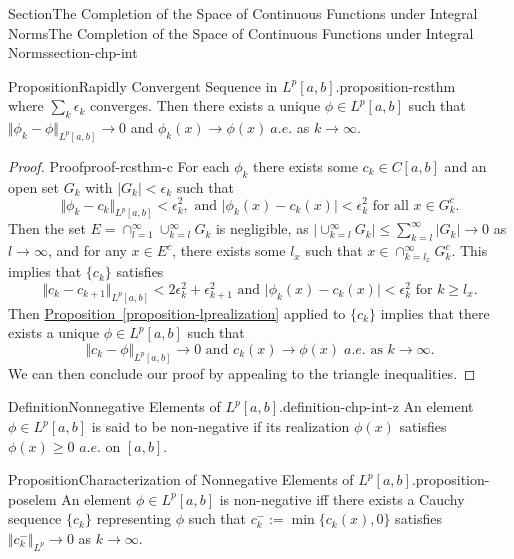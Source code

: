 \documentclass[oneside,10pt,]{article}
\newcommand{\xreffont}{\relax}
\numberwithin{equation}{section}
\begin{document}
\begin{sectionptx}{Section}{The Completion of the Space of Continuous Functions under Integral Norms}{}{The Completion of the Space of Continuous Functions under Integral Norms}{}{}{section-chp-int}
\begin{proposition}{Proposition}{Rapidly Convergent Sequence in \(L^{p}[a, b]\).}{}{proposition-rcsthm}
\begin{equation*}
\end{equation*}
where \(\sum_{k}  \epsilon_{k}\) converges. Then there exists a unique \(\phi \in L^{p}[a, b]\) such that \(\Vert \phi_{k} - \phi \Vert_{L^{p}[a, b]}\to 0\) and \(\phi_{k} (x) \to \phi (x)\)\(\ a.e.\) as \(k\to \infty\).\end{proposition}
\begin{proof}{Proof}{}{proof-rcsthm-c}
For each \(\phi_{k}\) there exists some \(c_{k} \in C[a,  b]\) and an open set  \(G_{k}\) with \(|G_{k}| < \epsilon_{k}\) such that%
\begin{equation*}
\Vert \phi_{k} - c_{k} \Vert_{L^{p}[a, b]} < \epsilon_{k}^{2}, \text{ and } 
\vert \phi_{k} (x) - c_{k}(x) \vert < \epsilon_{k}^{2} \text{ for all } x\in G_{k}^{c}.
\end{equation*}
Then the set \(E=\cap_{l=1}^{\infty}\cup_{k=l}^{\infty} G_{k}\) is negligible, as \(|\cup_{k=l}^{\infty} G_{k}|\le \sum_{k=l}^{\infty}|G_{k}| \to 0\) as \(l\to \infty\), and for any \(x\in E^{c}\), there exists some \(l_{x}\) such that \(x\in \cap_{k=l_{x}}^{\infty} G_{k}^{c}\). This implies that \(\{ c_{k}\}\) satisfies%
\begin{equation*}
\Vert c_{k} - c_{k+1} \Vert_{L^{p}[a, b]} < 2\epsilon_{k}^{2} + \epsilon_{k+1}^{2}
\text{ and } \vert \phi_{k}(x) - c_{k}(x) \vert< \epsilon_{k}^{2} \text{ for } k\ge l_{x}\text{.}
\end{equation*}
Then \hyperref[proposition-lprealization]{Proposition~{\xreffont\ref{proposition-lprealization}}} applied to  \(\{ c_{k}\}\) implies that there exists a unique \(\phi \in L^{p}[a, b]\) such that%
\begin{equation*}
\Vert c_{k} - \phi \Vert_{L^{p}[a, b]} \to 0 \text{ and } c_{k}(x)\to \phi (x)\; a.e. \text{ as } k\to \infty.
\end{equation*}
We can then conclude our proof by appealing to the triangle inequalities.\end{proof}
\begin{definition}{Definition}{Nonnegative Elements of \(L^{p}[a, b]\).}{definition-chp-int-z}%
An element \(\phi \in L^{p}[a, b]\) is said to be non-negative if its realization \(\phi (x)\) satisfies \(\phi (x) \ge 0\)  \(a.e.\) on \([a, b]\).%
\end{definition}
\begin{proposition}{Proposition}{Characterization of Nonnegative Elements of \(L^{p}[a, b]\).}{}{proposition-poselem}%
An element \(\phi \in L^{p}[a, b]\) is non-negative iff there exists a Cauchy sequence \(\{ c_{k}\}\) representing \(\phi\) such that \(c_{k}^{-}:=\min\{ c_{k}(x), 0\}\) satisfies \(\Vert c_{k}^{-} \Vert_{L^{p}}\to 0\) as \(k\to \infty\).%

\end{proposition}
\end{sectionptx}
\end{document}
